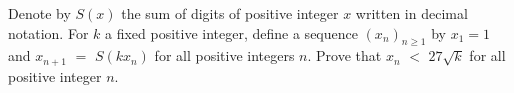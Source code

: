Denote by $S(x)$ the sum of digits of positive integer $x$ written in decimal notation. For $k$ a fixed positive integer, define a sequence $(x_n)_{n \geq 1}$ by $x_1=1$ and $x_{n+1}$ $=$ $S(kx_n)$ for all positive integers $n$. Prove that $x_n$ $<$ $27 \sqrt{k}$ for all positive integer $n$.